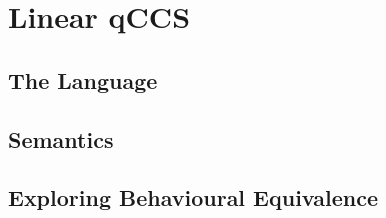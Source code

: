 \documentclass[10pt,a4paper, titlepage]{report}
\newcommand{\note}[1]{{\color{red} #1}}
\begin{document}
%
%
%
%
%
%



\chapter{Linear qCCS}

\section{The Language}


\section{Semantics}



\section{Exploring Behavioural Equivalence}

\end{document}
